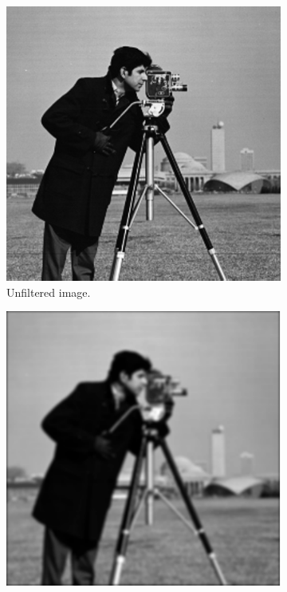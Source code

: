 \begin{figure}
\centering
\begin{subfigure}[b]{.49\textwidth}
\centering
\includegraphics[width=\textwidth]{cameraman.jpg}
\caption{Unfiltered image.}
\label{fig:cameraman}
\end{subfigure}
\begin{subfigure}[b]{.49\textwidth}
\centering
\includegraphics[width=\textwidth]{cameramanBlur.pdf}

\end{subfigure}
\end{figure}
